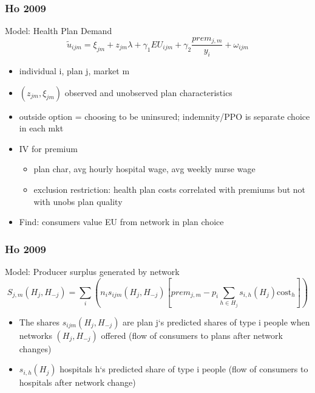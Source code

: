 \documentclass[aspectratio=169,11pt]{beamer}
\begin{document}
\begin{frame}
\frametitle{Ho 2009}

Model: Health Plan Demand
\[
\widetilde{u}_{ijm}=\xi _{jm}+z_{jm}\lambda +\gamma _{1}EU_{ijm}+\gamma _{2}%
\frac{prem_{j,m}}{y_{i}}+\omega _{ijm}
\]

\begin{itemize}
\item individual i, plan j, market m
\item $(z_{jm},\xi_{jm})$ observed and unobserved plan characteristics
\item outside option = choosing to be uninsured; indemnity/PPO is separate choice in each mkt
\item IV for premium
\begin{itemize}
\item plan char, avg hourly hospital wage, avg weekly nurse wage
\item exclusion restriction: health plan costs correlated with premiums but not with unobs plan quality
\end{itemize}
\item Find: consumers value EU from network in plan choice
\end{itemize}

\end{frame}

\begin{frame}
\frametitle{Ho 2009}

Model: Producer surplus generated by network
\[
S_{j,m}(H_{j},H_{-j})=\sum%
\limits_{i}(n_{i}s_{ijm}(H_{j},H_{-j})[prem_{j,m}-p_{i}\sum \limits_{h\in
H_{j}}s_{i,h}(H_{j})\text{cost}_{h}])
\]

\begin{itemize}
\item The shares $s_{ijm}(H_{j},H_{-j})$ are plan j`s predicted shares of type i people when networks $(H_{j},H_{-j})$ offered (flow of consumers to plans after network changes)
\item $s_{i,h}(H_{j})$ hospitals h`s predicted share of type i people (flow of consumers to hospitals after network change)

\end{itemize}

\end{frame}
\end{document}
